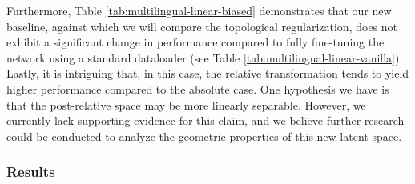 \documentclass[../main.tex]{subfiles}
\begin{document}
\begin{table}[ht!]
\centering
{}
\caption{Linear biased dataloader (over two random seeds)}
\label{tab:multilingual-linear-biased}
\end{table}

Furthermore, Table \ref{tab:multilingual-linear-biased} demonstrates that our new baseline, against which we will compare the topological regularization, does not exhibit a significant change in performance compared to fully fine-tuning the network using a standard dataloader (see Table \ref{tab:multilingual-linear-vanilla}).\\

Lastly, it is intriguing that, in this case, the relative transformation tends to yield higher performance compared to the absolute case. One hypothesis we have is that the post-relative space may be more linearly separable. However, we currently lack supporting evidence for this claim, and we believe further research could be conducted to analyze the geometric properties of this new latent space.


\subsubsection*{Results}
\end{document}

